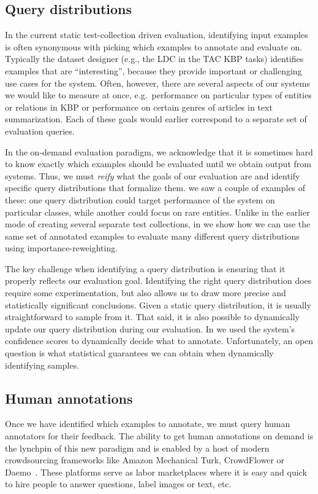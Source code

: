 \subsection{Query distributions}
In the current static test-collection driven evaluation, identifying input examples is often synonymous with picking which examples to annotate and evaluate on.
Typically the dataset designer (e.g., the LDC in the TAC KBP tasks) identifies examples that are ``interesting'', because they provide important or challenging use cases for the system.
Often, however, there are several aspects of our systems we would like to measure at once, e.g.\ performance on particular types of entities or relations in KBP or performance on certain genres of articles in text summarization.
Each of these goals would earlier correspond to a separate set of evaluation queries. 

In the on-demand evaluation paradigm, 
  we acknowledge that it is sometimes hard to know exactly which examples should be evaluated until we obtain output from systems.
Thus, we must \textit{reify} what the goals of our evaluation are and identify specific query distributions that formalize them.
 we saw a couple of examples of these: one query distribution could target performance of the system on particular classes, while another could focus on rare entities.
Unlike in the earlier mode of creating several separate test collections, in  we show how we can use the same set of annotated examples to evaluate many different query distributions using importance-reweighting.

The key challenge when identifying a query distribution is ensuring that it properly reflects our evaluation goal.
Identifying the right query distribution does require some experimentation, but also allows us to draw more precise and statistically significant conclusions.
Given a static query distribution, it is usually straightforward to sample from it.
That said, it is also possible to dynamically update our query distribution during our evaluation.
In  we used the system's confidence scores to dynamically decide what to annotate.
Unfortunately, an open question is what statistical guarantees we can obtain when dynamically identifying samples.

\subsection{Human annotations}
Once we have identified which examples to annotate, we must query human annotators for their feedback.
The ability to get human annotations on demand is the lynchpin of this new paradigm and is enabled by a host of modern crowdsourcing frameworks like Amazon Mechanical Turk, CrowdFlower or Daemo~\cite{}.
These platforms serve as labor marketplaces where it is easy and quick to hire people to answer questions, label images or text, etc.

